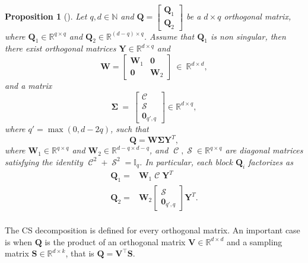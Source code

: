 \documentclass[twoside,11pt]{book}
\newtheorem{proposition}{Proposition}
\numberwithin{theorem}{chapter}
\numberwithin{definition}{chapter}
\numberwithin{proposition}{chapter}
\numberwithin{corollary}{chapter}
\numberwithin{example}{chapter}
\numberwithin{lemma}{chapter}
\DeclareMathOperator{\Tran}{\intercal}
\DeclareMathOperator{\Sinmatrix}{\mathcal{S}}
\DeclareMathOperator{\Cosmatrix}{\mathcal{C}}
\begin{document}
\begin{proposition}[\citealp{GoVa96}]
Let $q,d \in \mathbb{N}$ and $\bm{Q} =
\left[
\begin{array}{c}
\bm{Q}_{1}  \\
\hline
\bm{Q}_{2}
\end{array}
\right]
$ be a $d\times q$ orthogonal matrix, where $\bm{Q}_{1} \in \mathbb{R}^{q \times q}$ and $\bm{Q}_{2} \in \mathbb{R}^{(d-q)\times q}$. Assume that $\bm{Q}_{1}$ is non singular, then there exist orthogonal matrices $\bm{Y}\in\mathbb{R}^{d \times q}$ and
\begin{equation}
 \bm{W} =
\left[
\begin{array}{c|c}
\bm{W}_{1} & \bm{0} \\
\hline
\bm{0} & \bm{W}_{2}
\end{array}
\right]~\in~\mathbb{R}^{d \times d},
\end{equation}
and a matrix
\begin{equation}
\bm{\Sigma}~=~\left[
\begin{array}{c}
\Cosmatrix \\
\hline
\Sinmatrix \\
\hline
\bm{0}_{q',q}
\end{array}
\right] \in \mathbb{R}^{d \times q},
\end{equation}
where $q' = \max(0,d-2q)$, such that
\begin{equation}
    \bm{Q} = \bm{W}\bm{\Sigma}\bm{Y}^{T},
\end{equation}
where $\bm{W}_{1} \in \mathbb{R}^{q \times q}$ and $\bm{W}_{2} \in \mathbb{R}^{d-q \times d-q}$, and $\Cosmatrix, \Sinmatrix \in \mathbb{R}^{q\times q}$ are diagonal matrices satisfying the identity $\Cosmatrix^{2} + \Sinmatrix^{2} = \mathbb{I}_{q}$.
In particular, each block $\bm{Q}_{i}$ factorizes as
\begin{equation}
\begin{split}
    \bm{Q}_{1} = & \bm{W}_{1}\Cosmatrix\bm{Y}^{T} \\
    \bm{Q}_{2} = & \bm{W}_{2}\left[
\begin{array}{c}
\Sinmatrix \\
\hline
\bm{0}_{q',q}
\end{array}
\right]\bm{Y}^{T} .\\
\end{split}
\end{equation}

\label{CSD_proposition}
\end{proposition}
The CS decomposition is defined for every orthogonal matrix. An important case is when $\bm{Q}$ is the product of an orthogonal matrix $\bm{V} \in \mathbb{R}^{d \times d}$ and a sampling matrix $\bm{S} \in \mathbb{R}^{d \times k}$, that is $\bm{Q} = \bm{V}^{\Tran}\bm{S}$.
\end{document}
